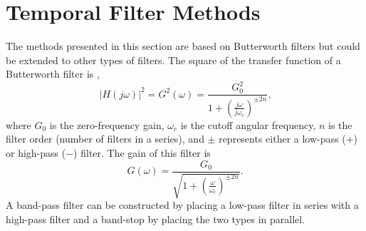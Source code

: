 \section{Temporal Filter Methods}
The methods presented in this section are based on Butterworth filters but could be extended to other types of filters.
The square of the transfer function of a Butterworth filter is \cite{Butterworth-1930-DvDrjKha},
\begin{equation}
 |H(j\omega)|^2 = G^2(\omega) = \frac{G_0^2}{1+\left(\frac{j\omega}{j\omega_c}\right)^{\pm2n}} \textrm{,}
 \label{eqn:06_butterworth}
\end{equation}
where $G_0$ is the zero-frequency gain, $\omega_c$ is the cutoff angular frequency, $n$ is the filter order (number of filters in a series), and $\pm$ represents either a low-pass ($+$) or high-pass ($-$) filter.
The gain of this filter is
\begin{equation}
  G(\omega) = \frac{G_0}{\sqrt{1+\left(\frac{\omega}{\omega_c}\right)^{\pm2n}}} \textrm{.}
  \label{eqn:06_butterworth_gain}
\end{equation}
A band-pass filter can be constructed by placing a low-pass filter in series with a high-pass filter and a band-stop by placing the two types in parallel.

